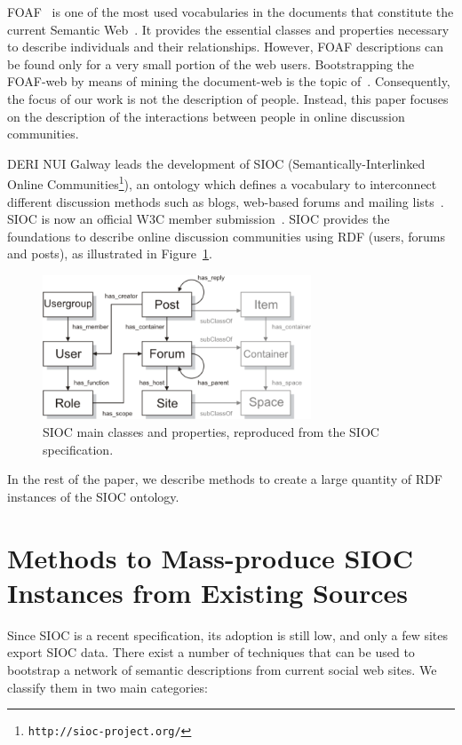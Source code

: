 \documentclass{../templates/www2008-submission}
\begin{document}
FOAF~\cite{FOAF} is one of the most used vocabularies in the documents that
constitute the current Semantic Web~\cite{Ding2005, Finin2005}.
It provides the essential classes and properties necessary
to describe individuals
and their relationships. However, FOAF descriptions can be found
only for a very small portion of the web users. Bootstrapping the
FOAF-web by means of mining the document-web is the topic
of~\cite{Mika2004}. Consequently, the focus of our work is not the
description of people. Instead, this paper focuses on the description
of the interactions between people in online discussion communities.

DERI NUI Galway leads the development of SIOC (Seman\-ti\-cally-Interlinked Online
Communities\footnote{\texttt{http://sioc-project.org/}}), an ontology which 
defines a vocabulary to interconnect different discussion methods such 
as blogs, web-based forums and mailing lists~\cite{Breslin2006,Breslin2005}.
SIOC is now an official W3C member submission~\cite{Bojars2007}.
SIOC provides the foundations to describe online discussion
communities using RDF (users, forums and posts), as illustrated in
Figure~\ref{fig:sioc}.

\begin{figure}
 \centering
 \includegraphics[width=8cm]{images/sioc.png}
 \caption{\label{fig:sioc}SIOC main classes and properties, reproduced from the SIOC specification.}
\end{figure}

In the rest of the paper, we describe methods to create a large
quantity of RDF instances of the SIOC ontology.


\section{Methods to Mass-produce SIOC Instances from Existing Sources}\label{sec:taxonomy}

Since SIOC is a recent specification, its adoption is still low, and
only a few sites export SIOC data. There exist a number of techniques
that can be used to bootstrap a network of semantic descriptions from
current social web sites. We classify them in two main categories:
\end{document}

